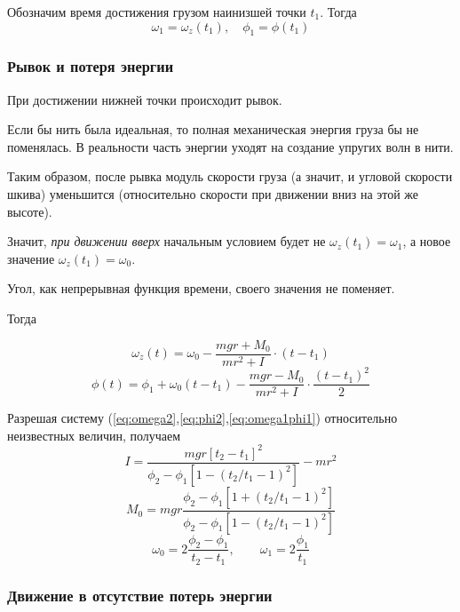 \documentclass[a4paper,12pt]{article}
\begin{document}
Обозначим время достижения грузом наинизшей точки $t_1$. Тогда
\begin{equation}
	\label{eq:omega1phi1}
	\omega_1=\omega_z(t_1), \quad \phi_1=\phi(t_1)
\end{equation}

\subsubsection{Рывок и потеря энергии} %

При достижении нижней точки происходит рывок. 

Если бы нить была идеальная, то полная механическая энергия груза бы не поменялась. В реальности часть энергии уходят на создание упругих волн в нити.

Таким образом, после рывка модуль скорости груза (а значит, и угловой скорости шкива) уменьшится (относительно скорости при движении вниз на этой же высоте).

Значит, \textit{при движении вверх} начальным условием будет не $\omega_z(t_1)=\omega_1$, а новое значение $\omega_z(t_1)=\omega_0$.

Угол, как непрерывная функция времени, своего значения не поменяет.

Тогда

\begin{equation}
	\label{eq:omega2}
	\omega_z(t)=\omega_0-\frac{mgr+M_0}{mr^2+I}\cdot (t-t_1)
\end{equation}
\begin{equation}
	\label{eq:phi2}
	\phi(t)=\phi_1+\omega_0(t-t_1)-\frac{mgr-M_0}{mr^2+I}\cdot \frac{(t-t_1)^2}{2}
\end{equation}

Разрешая систему (\ref{eq:omega2},\ref{eq:phi2},\ref{eq:omega1phi1}) относительно неизвестных величин, получаем
\begin{equation}
	I=\frac{mgr\left[t_2-t_1\right]^2}{\phi_2-\phi_1\left[1-(t_2/t_1-1)^2\right]}-mr^2
\end{equation}
\begin{equation}
	M_0=mgr\frac{\phi_2-\phi_1\left[1+(t_2/t_1-1)^2\right]}
				{\phi_2-\phi_1\left[1-(t_2/t_1-1)^2\right]}
\end{equation}
\begin{equation}
	\omega_0=2\frac{\phi_2-\phi_1}{t_2-t_1}, \qquad
	\omega_1=2\frac{\phi_1}{t_1}
\end{equation}

\subsubsection{Движение в отсутствие потерь энергии}
\end{document}
